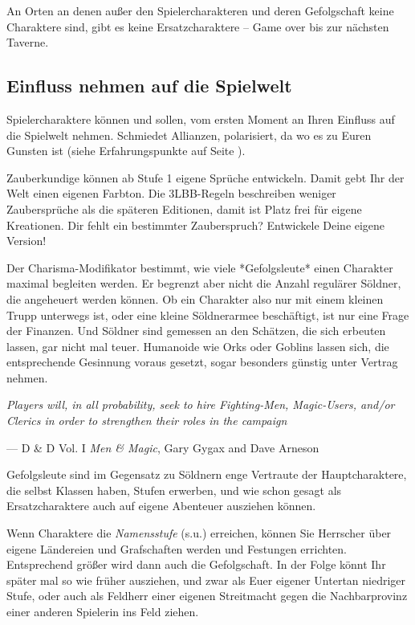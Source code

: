 \documentclass[11pt]{wbzine}
\begin{document}
\begin{multicols}{2}
    An Orten an denen außer den Spielercharakteren und deren
    Gefolgschaft keine Charaktere sind, gibt es keine
    Ersatzcharaktere – Game over bis zur nächsten Taverne.

    \subsection{Einfluss nehmen auf die Spielwelt}

    Spielercharaktere können und sollen, vom ersten Moment an Ihren
    Einfluss auf die Spielwelt nehmen. Schmiedet Allianzen,
    polarisiert, da wo es zu Euren Gunsten ist (siehe
    Erfahrungspunkte auf Seite \pageref{xp}). 

    Zauberkundige können ab Stufe 1 eigene Sprüche entwickeln. Damit
    gebt Ihr der Welt einen eigenen Farbton. Die 3LBB-Regeln
    beschreiben weniger Zaubersprüche als die späteren Editionen,
    damit ist Platz frei für eigene Kreationen. Dir fehlt ein
    bestimmter Zauberspruch? Entwickele Deine eigene Version!

    Der Charisma-Modifikator bestimmt, wie viele *Gefolgsleute*
    einen Charakter maximal begleiten werden. Er begrenzt aber nicht
    die Anzahl regulärer Söldner, die angeheuert werden können. Ob
    ein Charakter also nur mit einem kleinen Trupp unterwegs ist,
    oder eine kleine Söldnerarmee beschäftigt, ist nur eine Frage
    der Finanzen. Und Söldner sind gemessen an den Schätzen, die
    sich erbeuten lassen, gar nicht mal teuer. Humanoide wie Orks
    oder Goblins lassen sich, die entsprechende Gesinnung voraus
    gesetzt, sogar besonders günstig unter Vertrag nehmen.

    \begin{tcolorbox} 
	    \textit{Players will, in all probability, seek to hire
    		Fighting-Men, Magic-Users, and/or Clerics in order to strengthen their
    		roles in the campaign}

	--- D \& D Vol. I \textit{Men \& Magic}, Gary Gygax and Dave Arneson
    \end{tcolorbox}

    Gefolgsleute sind im Gegensatz zu Söldnern enge Vertraute der
    Hauptcharaktere, die selbst Klassen haben, Stufen erwerben, und
    wie schon gesagt als Ersatzcharaktere auch auf eigene Abenteuer
    ausziehen können.

    Wenn Charaktere die \textit{Namensstufe} (s.u.) erreichen,
    können Sie Herrscher über eigene Ländereien und Grafschaften
    werden und Festungen errichten. Entsprechend größer wird dann
    auch die Gefolgschaft. In der Folge könnt Ihr später mal so wie
    früher ausziehen, und zwar als Euer eigener Untertan niedriger
    Stufe, oder auch als Feldherr einer eigenen Streitmacht gegen
    die Nachbarprovinz einer anderen Spielerin ins Feld ziehen.


\end{multicols}
\end{document}
